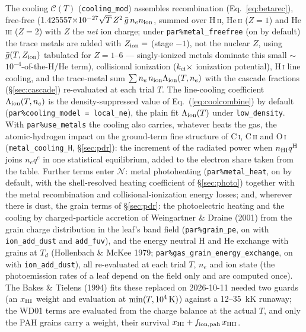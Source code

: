 \documentclass[english,a4paper]{my_memo}
\newcommand{\code}[1]{\texttt{#1}}
\begin{document}
The cooling $\mathcal{C}(T)$ (\code{cooling\_mod}) assembles recombination
(Eq.~\ref{eq:betarec}), free-free
($1.425557{\times}10^{-27}\sqrt{T}\,Z^2\,\bar g\,n_e n_{\rm ion}$, summed
over H\,\textsc{ii}, He\,\textsc{ii} ($Z=1$) and He\,\textsc{iii} ($Z=2$)
with $Z$ the \emph{net} ion charge; under \code{par\%metal\_freefree} (on
by default) the trace metals are added with $Z_{\rm ion}=$ (stage $-1$),
not the nuclear $Z$, using $\bar g(T, Z_{\rm ion})$ tabulated for
$Z=1$--6 --- singly-ionized metals dominate this small
$\sim$$10^{-4}$-of-the-H/He term),
collisional ionization ($k_{\rm ci}\times$ ionization potential),
H\,\textsc{i} line cooling, and the trace-metal sum
$\sum n_e\,n_{\rm ion}\Lambda_{\rm ion}(T,n_e)$ with the cascade fractions
(\S\ref{sec:cascade}) re-evaluated at each trial $T$.  The line-cooling
coefficient $\Lambda_{\rm ion}(T,n_e)$ is the density-suppressed value of
Eq.~(\ref{eq:coolcombine}) by default (\code{par\%cooling\_model =
local\_ne}), the plain fit $\Lambda_{\rm ion}(T)$ under
\code{low\_density}.  With \code{par\%use\_metals} the cooling also
carries, whatever heats the gas, the atomic-hydrogen impact on the
ground-term fine structure of C\,\textsc{i}, C\,\textsc{ii} and
O\,\textsc{i} (\code{metal\_cooling\_H}, \S\ref{sec:pdr}): the increment of
the radiated power when $n_{\rm HI}q^{\rm H}$ joins $n_e q^e$ in one
statistical equilibrium, added to the electron share taken from the table.
Further terms enter $\mathcal{N}$: metal photoheating
(\code{par\%metal\_heat}, on by default, with the shell-resolved heating
coefficient of \S\ref{sec:photo}) together with the metal recombination
and collisional-ionization energy losses; and, wherever there is dust, the
grain terms of \S\ref{sec:pdr}: the photoelectric heating and the cooling
by charged-particle accretion of Weingartner \& Draine (2001) from the
grain charge distribution in the leaf's band field (\code{par\%grain\_pe},
on with \code{ion\_add\_dust} and \code{add\_fuv}), and the energy neutral
H and He exchange with grains at $T_d$ (Hollenbach \& McKee 1979;
\code{par\%gas\_grain\_energy\_exchange}, on with \code{ion\_add\_dust}),
all re-evaluated at each trial $T$, $n_e$ and ion state (the photoemission
rates of a leaf depend on the field only and are computed once).  The
Bakes \& Tielens (1994) fits these replaced on 2026-10-11 needed two guards
(an $x_{\rm HI}$ weight and evaluation at $\min(T, 10^4\,{\rm K})$) against
a 12--35~kK runaway; the WD01 terms are evaluated from the charge
balance at the actual $T$, and only the PAH grains carry a weight, their
survival $x_{\rm HI} + f_{\rm ion,pah}\,x_{\rm HII}$.
\end{document}

